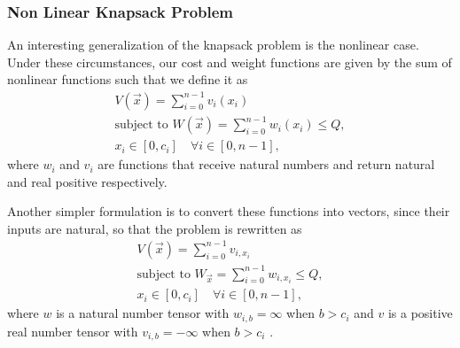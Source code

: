 \subsubsection{Non Linear Knapsack Problem}
An interesting generalization of the knapsack problem is the nonlinear case. Under these circumstances, our cost and weight functions are given by the sum of nonlinear functions such that we define it as
\begin{equation}
    \begin{gathered}
        V(\vec{x})=\sum_{i=0}^{n-1}v_i(x_i) \\
        \text{subject to }W(\vec{x})=\sum_{i=0}^{n-1}w_i(x_i)\leq{Q},\\
        x_i\in [0,c_i]\quad \forall i\in [0,n-1],
    \end{gathered}
\end{equation}
where $w_i$ and $v_i$ are functions that receive natural numbers and return natural and real positive respectively.

Another simpler formulation is to convert these functions into vectors, since their inputs are natural, so that the problem is rewritten as
\begin{equation}
    \begin{gathered}
        V(\vec{x})=\sum_{i=0}^{n-1}v_{i,x_i} \\
        \text{subject to }W_{\vec{x}}=\sum_{i=0}^{n-1}w_{i,x_i}\leq{Q},\\
        x_i\in [0,c_i]\quad \forall i\in [0,n-1],
    \end{gathered}
\end{equation}
where $w$ is a natural number tensor with $w_{i,b}=\infty$ when $b>c_i$ and $v$ is a positive real number tensor with $v_{i,b}=-\infty$ when $b>c_i$ .

